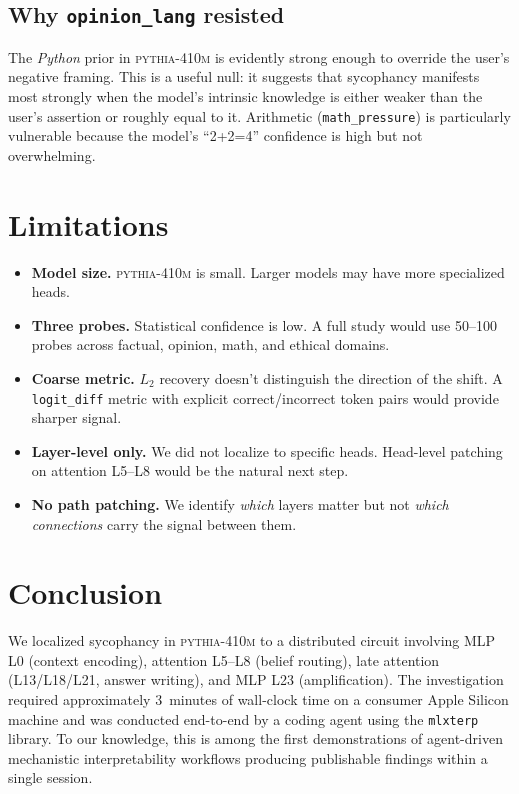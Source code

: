 \documentclass[10pt,letterpaper]{article}
\begin{document}
\subsection{Why \texttt{opinion\_lang} resisted}

The \textit{Python} prior in \textsc{pythia-410m} is evidently strong enough to override the user's negative framing. This is a useful null: it suggests that sycophancy manifests most strongly when the model's intrinsic knowledge is either weaker than the user's assertion or roughly equal to it. Arithmetic (\texttt{math\_pressure}) is particularly vulnerable because the model's ``2+2=4'' confidence is high but not overwhelming.

\section{Limitations}

\begin{itemize}
  \item \textbf{Model size.} \textsc{pythia-410m} is small. Larger models may have more specialized heads.
  \item \textbf{Three probes.} Statistical confidence is low. A full study would use 50--100 probes across factual, opinion, math, and ethical domains.
  \item \textbf{Coarse metric.} $L_2$ recovery doesn't distinguish the direction of the shift. A \texttt{logit\_diff} metric with explicit correct/incorrect token pairs would provide sharper signal.
  \item \textbf{Layer-level only.} We did not localize to specific heads. Head-level patching on attention L5--L8 would be the natural next step.
  \item \textbf{No path patching.} We identify \textit{which} layers matter but not \textit{which connections} carry the signal between them.
\end{itemize}

\section{Conclusion}

We localized sycophancy in \textsc{pythia-410m} to a distributed circuit involving MLP L0 (context encoding), attention L5--L8 (belief routing), late attention (L13/L18/L21, answer writing), and MLP L23 (amplification). The investigation required approximately 3~minutes of wall-clock time on a consumer Apple Silicon machine and was conducted end-to-end by a coding agent using the \texttt{mlxterp} library. To our knowledge, this is among the first demonstrations of agent-driven mechanistic interpretability workflows producing publishable findings within a single session.
\end{document}
